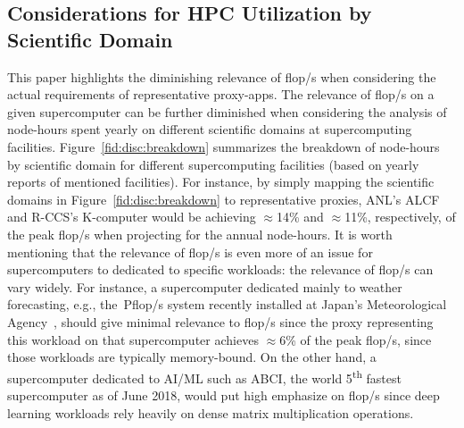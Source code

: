\subsection{Considerations for HPC Utilization by Scientific Domain}\label{ssec:workload_util}
%
\begin{comment}
\begin{figure}[tbp]
    \centering
    \texttt{[image: sys-util]}
    \caption{\label{fid:disc:breakdown} Annual HPC site/system utilization by domain; Labels acc. to Table~\ref{table:APP}: \texttt{geo} = Geo-/Earthscience, \texttt{chm} = Chemistry, \texttt{phy} = Physics, \texttt{qcd} = Lattice QCD, \texttt{mat} = Material Science/Engineering, \texttt{eng} = Engineering (Mechanics, CFD), \texttt{mcs} = Math/Computer Science, \texttt{bio} = Bioscience, \texttt{oth} = \textit{Other}}
\end{figure}
\end{comment}
%
This paper highlights the diminishing relevance of \unit[]{flop/s} when 
considering the actual requirements of representative proxy-apps.
The relevance of \unit[]{flop/s} on a given supercomputer can be further 
diminished when considering the analysis of node-hours spent yearly on
different scientific domains at supercomputing facilities.
Figure~\ref{fid:disc:breakdown} summarizes the breakdown of node-hours by
scientific domain for different supercomputing facilities (based on yearly
reports of mentioned facilities). For instance, by simply mapping the scientific
domains in Figure~\ref{fid:disc:breakdown} to representative proxies,
ANL's ALCF and \mbox{R-CCS's} K-computer would be achieving $\approx$14\% and
$\approx$11\%, respectively, of the peak \unit[]{flop/s} when projecting
for the annual node-hours. %
It is worth mentioning that the relevance of \unit[]{flop/s} is even more
of an issue for supercomputers to dedicated to specific workloads: the relevance of
\unit[]{flop/s} can vary widely. For instance, a supercomputer dedicated
mainly to weather forecasting, e.g., the~\unit[18]{Pflop/s} system recently 
installed at Japan's Meteorological Agency~\cite{japan_meteorological_agency_jma_jma_2018},
should give minimal relevance to \unit[]{flop/s} since the proxy representing
this workload on that supercomputer achieves $\approx$6\% of the peak \unit[]{flop/s},
since those workloads are typically memory-bound. On the other hand, a
supercomputer dedicated to AI/ML such as ABCI, the world 5\textsuperscript{th}
fastest supercomputer as of June 2018, would put high emphasize on \unit[]{flop/s}
since deep learning workloads rely heavily on dense matrix multiplication operations.


